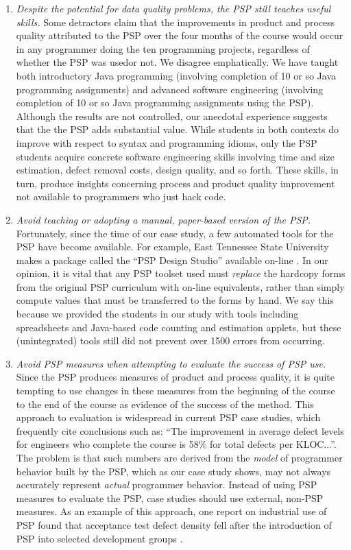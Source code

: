 \begin{enumerate}
  
\item {\em Despite the potential for data quality problems, the PSP still
    teaches useful skills.} Some detractors claim that the improvements in
  product and process quality attributed to the PSP over the four months of
  the course would occur in any programmer doing the ten programming projects,
  regardless of whether the PSP was usedor not. We disagree
  emphatically.  We have taught both introductory Java programming
  (involving completion of 10 or so Java programming assignments) and advanced
  software engineering (involving completion of 10 or so Java programming
  assignments using the PSP).  Although the results are not controlled,
  our anecdotal experience suggests that the
  the PSP adds substantial value. While students in both
  contexts do improve with respect to syntax and programming idioms, only
  the PSP students acquire concrete software engineering skills involving
  time and size estimation, defect removal costs, design quality, and so
  forth. These skills, in turn, produce insights concerning process and
  product quality improvement not available to programmers who just hack
  code.
  
\item {\em Avoid teaching or adopting a manual, paper-based version of the
    PSP.} Fortunately, since the time of our case study, a few automated
  tools for the PSP have become available. For example, East Tennessee
  State University makes a package called the ``PSP Design Studio''
  available on-line \cite{PSPS97}.  In our opinion, it is vital that any
  PSP toolset used must {\em replace} the hardcopy forms from the original
  PSP curriculum with on-line equivalents, rather than simply compute
  values that must be transferred to the forms by hand. We say this because
  we provided the students in our study with tools including spreadsheets
  and Java-based code counting and estimation applets, but these
  (unintegrated) tools still did not prevent over 1500 errors from
  occurring.
  
\item {\em Avoid PSP measures when attempting to evaluate the success of
    PSP use.} Since the PSP produces measures of product and process
  quality, it is quite tempting to use changes in these measures from the
  beginning of the course to the end of the course as evidence of the
  success of the method. This approach to evaluation is widespread in
  current PSP case studies, which frequently cite conclusions such as:
  ``The improvement in average defect levels for engineers who complete the
  course is 58\% for total defects per KLOC...''.  The problem is that such
  numbers are derived from the {\em model} of programmer behavior built by
  the PSP, which as our case study shows, may not always accurately
  represent {\em actual} programmer behavior.  Instead of using PSP
  measures to evaluate the PSP, case studies should use external, non-PSP
  measures.  As an example of this approach, one report on industrial use
  of PSP found that acceptance test defect density fell after the
  introduction of PSP into selected development groups \cite{Ferguson97}.
  

\end{enumerate}
